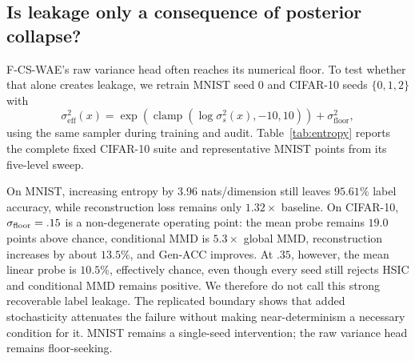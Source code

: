 \documentclass{article}
\begin{document}
\subsection{Is leakage only a consequence of posterior collapse?}
\label{sec:entropy}

F-CS-WAE's raw variance head often reaches its numerical floor.  To test
whether that alone creates leakage, we retrain MNIST seed 0 and CIFAR-10 seeds
$\{0,1,2\}$ with
\begin{equation}
\sigma_{\mathrm{eff}}^2(x)=
\exp(\operatorname{clamp}(\log\sigma_s^2(x),-10,10))+
\sigma_{\mathrm{floor}}^2,
\end{equation}
using the same sampler during training and audit.  Table~\ref{tab:entropy}
reports the complete fixed CIFAR-10 suite and representative MNIST points from
its five-level sweep.

\begin{table}[t]
\caption{Entropy intervention.  MNIST is seed 0; CIFAR-10 entries are rounded
three-seed means.  Probe/Gen-ACC are percentages; every CIFAR seed rejects
HSIC at $p=1/201$.}
\label{tab:entropy}
\centering
\scriptsize
\setlength{\tabcolsep}{3.5pt}
\end{table}

On MNIST, increasing entropy by 3.96 nats/dimension still leaves $95.61\%$
label accuracy, while reconstruction loss remains only $1.32\times$ baseline.
On CIFAR-10, $\sigma_{\rm floor}=.15$ is a non-degenerate operating point:
the mean probe remains $19.0$ points above chance, conditional MMD is
$5.3\times$ global MMD, reconstruction increases by about $13.5\%$, and
Gen-ACC improves.  At $.35$, however, the mean linear probe is $10.5\%$,
effectively chance, even though every seed still rejects HSIC and conditional
MMD remains positive.  We therefore do not call this strong recoverable label
leakage.  The replicated boundary shows that added stochasticity attenuates
the failure without making near-determinism a necessary condition for it.
MNIST remains a single-seed intervention; the raw variance head remains
floor-seeking.
\end{document}
